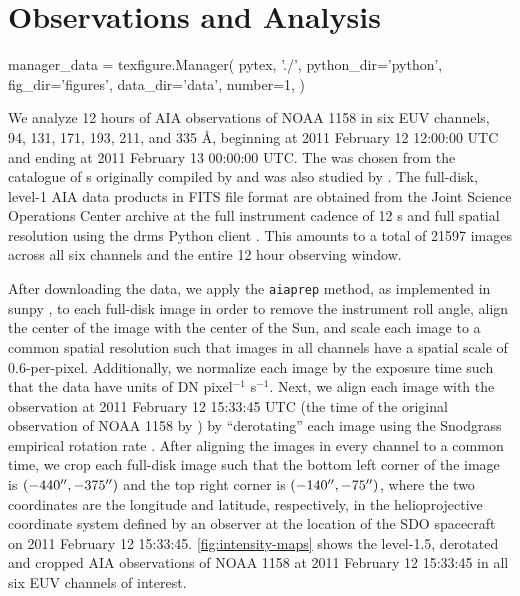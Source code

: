 \section{Observations and Analysis}\label{sec:observations}
\begin{pycode}
manager_data = texfigure.Manager(
    pytex, './',
    python_dir='python',
    fig_dir='figures',
    data_dir='data',
    number=1,
)
\end{pycode}

We analyze 12 hours of AIA observations of \AR{} NOAA 1158 in six EUV channels, 94, 131, 171, 193, 211, and 335 \AA{}, beginning at 2011 February 12 12:00:00 UTC and ending at 2011 February 13 00:00:00 UTC.
The \AR{} was chosen from the catalogue of \AR s originally compiled by \citet{warren_systematic_2012} and was also studied by .
The full-disk, level-1 AIA data products in FITS file format are obtained from the Joint Science Operations Center \citep[JSOC,][]{couvidat_observables_2016} archive at the full instrument cadence of 12 s and full spatial resolution using the drms Python client \citep{glogowski_drms_2019}.
This amounts to a total of 21597 images across all six channels and the entire 12 hour observing window.

After downloading the data, we apply the \texttt{aiaprep} method, as implemented in sunpy \citep{sunpy_community_sunpypython_2015}, to each full-disk image in order to remove the instrument roll angle, align the center of the image with the center of the Sun, and scale each image to a common spatial resolution such that images in all channels have a spatial scale of 0.6\arcsec-per-pixel.
Additionally, we normalize each image by the exposure time such that the data have units of DN pixel$^{-1}$ s$^{-1}$.
Next, we align each image with the observation at 2011 February 12 15:33:45 UTC (the time of the original observation of NOAA 1158 by \citet{warren_systematic_2012}) by ``derotating'' each image using the Snodgrass empirical rotation rate \citep{snodgrass_magnetic_1983}.
After aligning the images in every channel to a common time, we crop each full-disk image such that the bottom left corner of the image is $(-440\mbox{$^{\prime\prime}$},-375\mbox{$^{\prime\prime}$})$ and the top right corner is $(-140\mbox{$^{\prime\prime}$},-75\mbox{$^{\prime\prime}$})$, where the two coordinates are the longitude and latitude, respectively, in the helioprojective coordinate system \citep[see][]{thompson_coordinate_2006} defined by an observer at the location of the SDO spacecraft on 2011 February 12 15:33:45.
\autoref{fig:intensity-maps} shows the level-1.5, derotated and cropped AIA observations of \AR{} NOAA 1158 at 2011 February 12 15:33:45 in all six EUV channels of interest.


